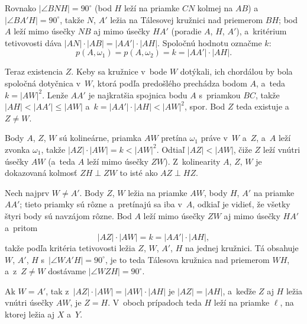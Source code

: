 {    Rovnako $|\angle BNH| = 90^\circ$ (bod $H$ leží na priamke $CN$ kolmej na $AB$) a~$|\angle BA'H| = 90^\circ$, takže $N$, $A'$ ležia na Tálesovej kružnici nad priemerom $BH$; bod $A$ leží mimo úsečky $NB$ aj mimo úsečky $HA'$ (poradie $A$, $H$, $A'$), a~kritérium tetivovosti dáva $|AN| \cdot |AB| = |AA'| \cdot |AH|$. Spoločnú hodnotu označme $k$:
    $$
    p(A,\omega_1) = p(A,\omega_2) = k = |AA'| \cdot |AH|.
    $$

    Teraz existencia $Z$. Keby sa kružnice v~bode $W$ dotýkali, ich chordálou by bola spoločná dotyčnica v~$W$, ktorá podľa predošlého prechádza bodom $A$, a~teda $k = |AW|^2$. Lenže $AA'$ je najkratšia spojnica bodu $A$ s~priamkou $BC$, takže $|AH| < |AA'| \leq |AW|$ a~$k = |AA'| \cdot |AH| < |AW|^2$, spor. Bod $Z$ teda existuje a~$Z \neq W$.

    Body $A$, $Z$, $W$ sú kolineárne, priamka $AW$ pretína $\omega_1$ práve v~$W$ a~$Z$, a~$A$ leží zvonka $\omega_1$, takže $|AZ| \cdot |AW| = k < |AW|^2$. Odtiaľ $|AZ| < |AW|$, čiže $Z$ leží vnútri úsečky $AW$ (a~teda $A$ leží mimo úsečky $ZW$). Z~kolinearity $A$, $Z$, $W$ je dokazovaná kolmosť $ZH \perp ZW$ to isté ako $AZ \perp HZ$.

    Nech najprv $W \neq A'$. Body $Z$, $W$ ležia na priamke $AW$, body $H$, $A'$ na priamke $AA'$; tieto priamky sú rôzne a~pretínajú sa iba v~$A$, odkiaľ je vidieť, že všetky štyri body sú navzájom rôzne. Bod $A$ leží mimo úsečky $ZW$ aj mimo úsečky $HA'$ a~pritom
    $$
    |AZ| \cdot |AW| = k = |AA'| \cdot |AH|,
    $$
    takže podľa kritéria tetivovosti ležia $Z$, $W$, $A'$, $H$ na jednej kružnici. Tá obsahuje $W$, $A'$, $H$ s~$|\angle WA'H| = 90^\circ$, je to teda Tálesova kružnica nad priemerom $WH$, a~z~$Z \neq W$ dostávame $|\angle WZH| = 90^\circ$.

    Ak $W = A'$, tak z~$|AZ| \cdot |AW| = |AW| \cdot |AH|$ je $|AZ| = |AH|$, a~keďže $Z$ aj $H$ ležia vnútri úsečky $AW$, je $Z = H$. V~oboch prípadoch teda $H$ leží na priamke $\ell$, na ktorej ležia aj $X$ a~$Y$.
}

